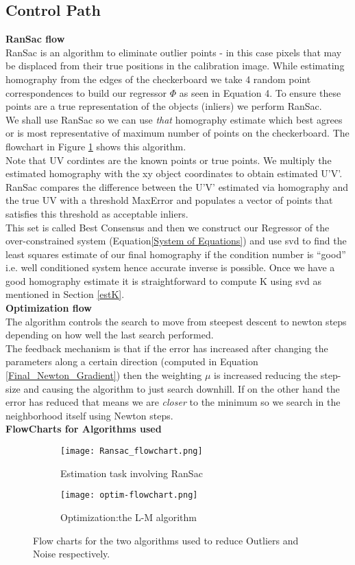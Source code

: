 \documentclass[titlepage]{article}
\begin{document}
\subsection{Control Path}
\textbf{RanSac flow}\\
RanSac is an algorithm to eliminate outlier points - in this case pixels that may be displaced from their true positions in the calibration image. While estimating homography from the edges of the checkerboard we take 4 random point correspondences to build our regressor $\Phi$ as seen in Equation 4. To ensure these points are a true representation of the objects (inliers) we perform RanSac.\\
%
We shall use RanSac so we can use \textit{that} homography estimate which best agrees or is most representative of maximum number of points on the checkerboard. The flowchart in Figure \ref{Ransac_Flow} shows this algorithm.\\
Note that UV cordintes are the known points or true points. We multiply the estimated homography with the xy object coordinates to obtain estimated U’V’. RanSac compares the difference between the U’V’ estimated via homography and the true UV with a threshold MaxError and populates a vector of points that satisfies this threshold as acceptable inliers. \\
This set is called Best Consensus and then we construct our Regressor of the over-constrained system (Equation\ref{System of Equations}) and use svd to find the least squares estimate of our final homography if the condition number is “good” i.e. well conditioned system hence accurate inverse is possible. Once we have a good homography estimate it is straightforward to compute K using svd as mentioned in Section \ref{estK}.\\
\textbf{Optimization flow}\\
The algorithm controls the search to move from steepest descent to newton steps depending on how well the last search performed. \\
The feedback mechanism is that if the error has increased after changing the parameters along a certain direction (computed in Equation \ref{Final_Newton_Gradient}) then the weighting $\mu$ is increased reducing the step-size and causing the algorithm to just search downhill. If on the other hand the error has reduced that means we are \textit{closer} to the minimum so we search in the neighborhood itself using Newton steps.\\
\textbf{FlowCharts for Algorithms used}
\begin{figure}
\begin{subfigure}{0.5\textwidth}
   \texttt{[image: Ransac\_flowchart.png]}
   \caption{Estimation task involving RanSac}
   \label{Ransac_Flow}
\end{subfigure} 
\begin{subfigure}{0.5\textwidth}
    \texttt{[image: optim-flowchart.png]}
    \caption{Optimization:the L-M algorithm}
  \label{Optim_Flow}
\end{subfigure} 
\caption{Flow charts for the two algorithms used to reduce Outliers and Noise respectively.}
\end{figure}
\end{document}
